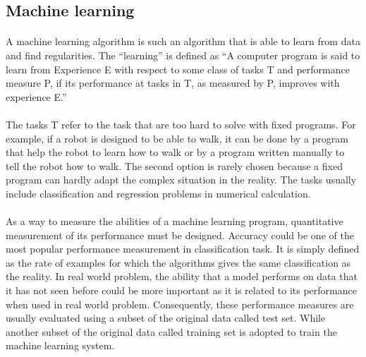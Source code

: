 \subsection{Machine learning}
\label{lr_sec:machine_learning}
\paragraph{}
A machine learning algorithm is such an algorithm that is able to learn from data and find regularities.
The ``learning'' is defined as ``A computer program is said to learn from Experience E with respect to some class of tasks T and performance measure P, if its performance at tasks in T, as measured by P, improves with experience E.'' \citep{Mitchell:1997:ML:541177}
\paragraph{}
The tasks T refer to the task that are too hard to solve with fixed programs.
For example, if a robot is designed to be able to walk, it can be done by a program that help the robot to learn how to walk or by a program written manually to tell the robot how to walk.
The second option is rarely chosen because a fixed program can hardly adapt the complex situation in the reality.
The tasks usually include classification and regression problems in numerical calculation.

\paragraph{}
As a way to measure the abilities of a machine learning program, quantitative measurement of its performance must be designed.
Accuracy could be one of the most popular performance measurement in classification task.
It is simply defined as the rate of examples for which the algorithms gives the same classification as the reality.
In real world problem, the ability that a model performs on data that it has not seen before could be more important as it is related to its performance when used in real world problem.
Consequently, these performance measures are usually evaluated using a subset of the original data called test set.
While another subset of the original data called training set is adopted to train the machine learning system.

